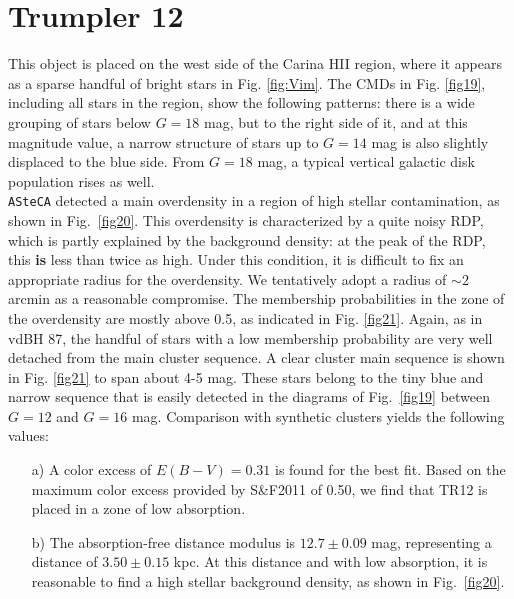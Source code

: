 \documentclass[draft]{aa}
\begin{document}
\section{Trumpler 12}

This object is placed on the west side of the Carina HII region, where it appears
as a sparse handful of bright stars in Fig. \ref{fig:Vim}. The CMDs in Fig.
\ref{fig19}, including all stars in the region, show the following patterns:
there is a wide grouping of stars below $G=18$ mag, but to the right side of
it, and at this magnitude value, a narrow structure of stars up to $G=14$
mag is also slightly displaced to the blue side. From $G=18$ mag, a typical
vertical galactic disk population rises as well.\\

\texttt{ASteCA} detected a main overdensity in a region of high
stellar contamination, as shown in Fig.~\ref{fig20}.
This overdensity is characterized by a quite noisy RDP, which is partly
explained by the background density: at the peak of the RDP, this \textbf{is}
less than twice as high.
Under this condition, it is difficult to fix an appropriate
radius for the overdensity. We tentatively adopt a radius of $\sim2$ arcmin as a
reasonable compromise.
The membership probabilities in the zone of the overdensity are mostly
above 0.5, as indicated in Fig. \ref{fig21}. Again, as in vdBH 87, the
handful of stars with a low membership probability are very well detached from the main
cluster sequence.
%
A clear cluster main sequence is shown in Fig. \ref{fig21} to span about
4-5 mag. These stars belong to the tiny blue and narrow sequence that is
easily detected in the diagrams of Fig.~\ref{fig19} between $G=12$ and $G=16$
mag. Comparison with synthetic clusters yields the following values:

\begin{itemize}
\item [a)] A color excess of $E(B-V)=0.31$ is found for the best fit.
    Based on the maximum color excess provided by S\&F2011 of 0.50, we find that
    TR12 is placed in a zone of low absorption.
\item [b)] The absorption-free distance modulus is $12.7\pm0.09$ mag,
representing a distance of $3.50\pm0.15$ kpc. At this distance and with
low absorption, it is reasonable to find a high stellar background density,
as shown in Fig.~\ref{fig20}.
\end{itemize}
\end{document}
